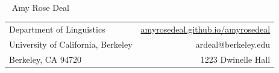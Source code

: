 \documentclass[12pt]{article}
\begin{document}

\newenvironment{benumerate}[1]{
    \let\oldItem\item
    \def\item{\addtocounter{enumi}{-2}\oldItem}
    \begin{enumerate}[labelsep=.5cm,leftmargin=0cm,itemindent=0cm]
    \setcounter{enumi}{#1}
    \addtocounter{enumi}{1}
}{
    \end{enumerate}
}






\thispagestyle{empty}



~

\vspace{-1.5cm}


\LARGE ~ \hspace{-1.7in}
Amy Rose Deal

\hspace{1em}


\normalsize

\ind
\begin{tabular*}
{1.0\textwidth}{@{\extracolsep{\fill}}lr}
 Department of Linguistics 	
 		&                                   {\href{https://amyrosedeal.github.io/amyrosedeal/}{amyrosedeal.github.io/amyrosedeal}}  \\
University of California, Berkeley 	&	ardeal@berkeley.edu	          \\
Berkeley, CA 94720				&	  1223  Dwinelle Hall 	     \\
\end{tabular*}


\reversemarginpar

\setlength{\marginparwidth}{.85in}


\vspace{18pt}

\medskip
{}
\end{document}
